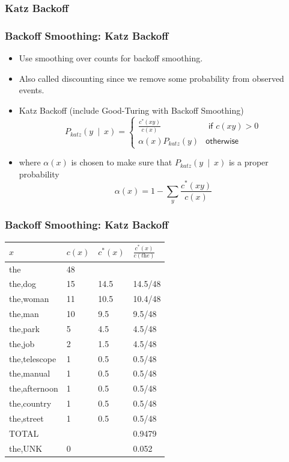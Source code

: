 \subsubsection{Katz Backoff}

\begin{frame}
\frametitle{Backoff Smoothing: Katz Backoff}
\begin{itemize}[<+->]
\item Use smoothing over counts for backoff smoothing.
\item Also called discounting since we remove some probability from observed events.
\item Katz Backoff (include Good-Turing with Backoff Smoothing)
\[ P_{\textit{katz}}(y~\mid~x) = \left\{ 
\begin{array}{cc}
\frac{ c^\ast(xy) }{ c(x) } & \textsf{ if $c(xy) > 0$} \\
\alpha(x) P_{\textit{katz}} (y) & \textsf{otherwise}
\end{array}
\right. \]
\item where $\alpha(x)$ is chosen to make sure that $P_{\textit{katz}}(y~\mid~x)$ is a proper probability
\[ \alpha(x) = 1 - \sum_y \frac{ c^\ast(xy) }{ c(x) } \]
\end{itemize}
\end{frame}

\begin{frame}
\frametitle{Backoff Smoothing: Katz Backoff}
\begin{center}
\begin{tabular}{ | l | l | l | l | }
\hline
$x$ & $c(x)$ & $c^\ast(x)$ & $\frac{c^\ast(x)}{c(\textit{the})}$ \\
\hline
the & 48 & & \\
the,dog & 15 & 14.5 & 14.5/48 \\
the,woman & 11 & 10.5 & 10.4/48 \\
the,man & 10 & 9.5 & 9.5/48 \\
the,park & 5 & 4.5 & 4.5/48 \\
the,job & 2 & 1.5 & 4.5/48 \\
the,telescope & 1 & 0.5 & 0.5/48 \\
the,manual & 1 & 0.5 & 0.5/48 \\
the,afternoon & 1 & 0.5 & 0.5/48 \\
the,country & 1 & 0.5 & 0.5/48 \\
the,street & 1 & 0.5 & 0.5/48 \\
\hline
TOTAL & & & 0.9479 \\
\hline
the,UNK & 0 & & 0.052 \\
\hline
\end{tabular}
\end{center}
\end{frame}

